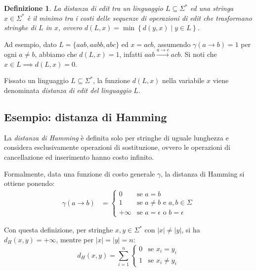 \documentclass[a4paper,12pt]{report}
\newtheorem{definition}{Definizione}[chapter]
\theoremstyle{propositionstyle}
\begin{document}
    \begin{definition}
        La distanza di edit tra un linguaggio $L \subseteq \Sigma^*$ ed una stringa $x \in \Sigma^*$ è il minimo tra i costi delle sequenze di operazioni di edit
        che trasformano stringhe di $L$ in $x$, ovvero $d\left(L, x\right) = \min\left\{d\left(y, x\right) \mid y \in L \right\}$.
    \end{definition}

    Ad esempio, dato $L = \{aab, aabb, abc\}$ ed $x = acb$, assumendo $\gamma(a \rightarrow b) = 1$ per ogni $a \neq b$, abbiamo che $d\left(L, x\right) = 1$, infatti $aab \xrightarrow{a \rightarrow c} acb$. Si noti che $x \in L \implies d\left(L, x\right) = 0$.

    Fissato un linguaggio $L \subseteq \Sigma^*$, la funzione $d\left(L, x\right)$ nella variabile $x$ viene denominata \textit{distanza di edit del linguaggio} $L$.

    \subsection{Esempio: distanza di Hamming}

    La \textit{distanza di Hamming} è definita solo per stringhe di uguale lunghezza e considera esclusivamente operazioni di sostituzione, ovvero le operazioni di cancellazione ed inserimento hanno costo infinito.

    Formalmente, data una funzione di costo generale $\gamma$, la distanza di Hamming si ottiene ponendo:
    \begin{align}
        \gamma(a \rightarrow b) &= \begin{cases}
                                       0 & \text{se } a = b \\
                                       1 & \text{se } a \neq b \text{ e } a, b \in \Sigma \\
                                       +\infty & \text{se } a = \epsilon \text{ o } b = \epsilon
        \end{cases}
    \end{align}

    Con questa definizione, per stringhe $x, y \in \Sigma^*$ con $|x| \neq |y|$, si ha $d_H(x, y) = +\infty$, mentre per $|x| = |y| = n$:
    \[
        d_H(x, y) = \sum_{i=1}^{n} \begin{cases}
                                       0 & \text{se } x_i = y_i \\
                                       1 & \text{se } x_i \neq y_i
        \end{cases}
    \]
\end{document}
